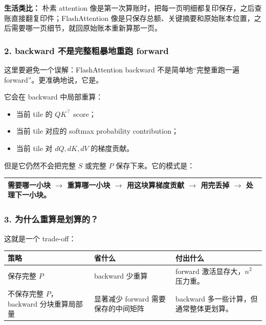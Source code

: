 \begin{intubox}
\textbf{生活类比：} 朴素 attention 像是第一次算账时，把每一页明细都复印保存，之后查账直接翻复印件；FlashAttention 像是只保存总额、关键摘要和原始账本位置，之后需要哪一页细节，就回原始账本重新算那一页。
\end{intubox}

\subsubsection*{2. backward 不是完整粗暴地重跑 forward}

这里要避免一个误解：FlashAttention backward 不是简单地“完整重跑一遍 forward”。更准确地说，它是。

它会在 backward 中局部重算：

\begin{itemize}[leftmargin=1.5em]
  \item 当前 tile 的 $QK^\top$ score；
  \item 当前 tile 对应的 softmax probability contribution；
  \item 当前 tile 对 $dQ,dK,dV$ 的梯度贡献。
\end{itemize}

但是它仍然不会把完整 $S$ 或完整 $P$ 保存下来。它的模式是：

\begin{center}
\begin{tabular}{p{13.2cm}}
\hline
需要哪一小块 $\rightarrow$ 重算哪一小块 $\rightarrow$ 用这块算梯度贡献 $\rightarrow$ 用完丢掉 $\rightarrow$ 处理下一小块。 \\
\hline
\end{tabular}
\end{center}

\subsubsection*{3. 为什么重算是划算的？}

这就是一个 trade-off：

\begin{center}
{\small
\begin{tabular}{p{3.4cm}p{4.4cm}p{5.0cm}}
\hline
\textbf{策略} & \textbf{省什么} & \textbf{付出什么} \\
\hline
保存完整 $P$ & backward 少重算 & forward 激活显存大，$n^2$ 压力重。 \\
不保存完整 $P$，backward 分块重算局部量 & 显著减少 forward 需要保存的中间矩阵 & backward 多一些计算，但通常整体更划算。 \\
\hline
\end{tabular}
}
\end{center}

